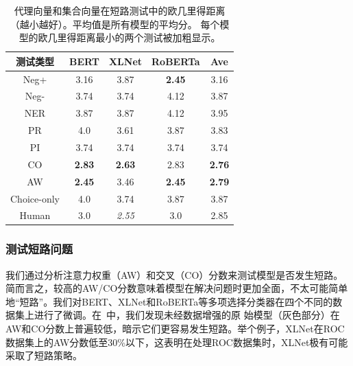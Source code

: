 
\begin{table}[th]
    \scriptsize
    \centering
    \begin{tabular}{c|cccc}\hline
    \toprule  
    \textbf{测试类型} &BERT  & XLNet & RoBERTa  &Ave\\ 
     \midrule
    {Neg+}      &     3.16	&3.87&	\textbf{2.45}	&3.16\\
    \midrule
    {Neg-}&    3.74&3.74&	4.12&	3.87\\
    \midrule
    {NER}    &    3.87&	3.87	&4.12	&3.95\\
    \midrule
    {PR}&   4.0&	3.61&	3.87	&3.83\\
    \midrule
    {PI}&    3.74	&3.74&	3.74&	3.74\\
    \midrule
    {CO}            & \textbf{ 2.83}	&\textbf{2.63}	&2.83	&\textbf{2.76}\\
    \midrule
    {AW}   &  \textbf{2.45}	&3.46&	\textbf{2.45}	&\textbf{2.79} \\
    \midrule
    {Choice-only}   &     4.0&	3.74&	3.87&	3.87\\
    \midrule
    {Human}   &3.0&	\emph{2.55}&	3.0&	2.85\\
    \bottomrule
    \hline
    \end{tabular}
    \caption{\label{tab3:agree} 
    代理向量和集合向量在短路测试中的欧几里得距离（越小越好）。平均值是所有模型的平均分。
    每个模型的欧几里得距离最小的两个测试被加粗显示。}
    \end{table}

\subsubsection*{测试短路问题}
\label{sec3:fix-sc}
我们通过分析注意力权重（AW）和交叉（CO）分数来测试模型是否发生短路。
简而言之，较高的AW/CO分数意味着模型在解决问题时更加全面，不太可能简单
地``短路''。我们对BERT、XLNet和RoBERTa等多项选择分类器在四个不同的数
据集上进行了微调。在~中，我们发现未经数据增强的原
始模型（灰色部分）在AW和CO分数上普遍较低，暗示它们更容易发生短路。举个例子，XLNet在ROC
数据集上的AW分数低至30\%以下，这表明在处理ROC数据集时，XLNet极有可能采取了短路策略。


